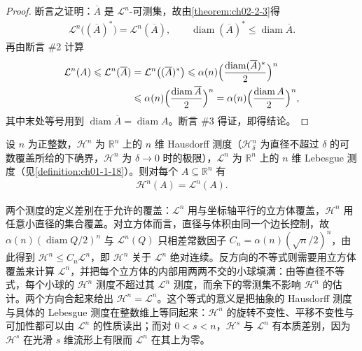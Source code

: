 \documentclass[../../main.tex]{subfiles}%
\begin{document}
\begin{proof}
断言之证明：$\overline A$ 是 $\mathcal{L}^n$-可测集，故由\cref{theorem:ch02-2-3}得%
\begin{align*}
\mathcal{L}^n\bigl((\overline A)^{*}\bigr)=\mathcal{L}^n(\overline A),\qquad
\operatorname{diam}(\overline A)^{*}\leqslant\operatorname{diam}\overline A .
\end{align*}
再由断言 \#2 计算
\begin{align*}
\mathcal{L}^n(A)\leqslant\mathcal{L}^n(\overline A)
&=\mathcal{L}^n\bigl((\overline A)^{*}\bigr)
\leqslant\alpha(n)\Bigl(\frac{\operatorname{diam}(\overline A)^{*}}{2}\Bigr)^n\\
&\leqslant\alpha(n)\Bigl(\frac{\operatorname{diam}\overline A}{2}\Bigr)^n
=\alpha(n)\Bigl(\frac{\operatorname{diam}A}{2}\Bigr)^n ,
\end{align*}
其中末处等号用到 $\operatorname{diam}\overline A=\operatorname{diam}A$。断言 \#3 得证，即得结论。
\end{proof}

\begin{theorem}\label{theorem:ch02-2-5}
设 $n$ 为正整数，$\mathcal{H}^n$ 为 $\mathbb{R}^n$ 上的 $n$ 维 Hausdorff 测度（$\mathcal{H}^n_\delta$ 为直径不超过 $\delta$ 的可数覆盖所给的下确界，$\mathcal{H}^n$ 为 $\delta\to0$ 时的极限），$\mathcal{L}^n$ 为 $\mathbb{R}^n$ 上的 $n$ 维 Lebesgue 测度（见\cref{definition:ch01-1-18}）。则对每个 $A\subseteq\mathbb{R}^n$ 有 %
\begin{align*}
\mathcal{H}^n(A)=\mathcal{L}^n(A).
\end{align*}
\end{theorem}

\begin{remark}\label{remark:ch02-thm-2-5-动机}
两个测度的定义差别在于允许的覆盖：$\mathcal{L}^n$ 用与坐标轴平行的立方体覆盖，$\mathcal{H}^n$ 用任意小直径的集合覆盖。对立方体而言，直径与体积由同一个边长控制，故 $\alpha(n)(\operatorname{diam}Q/2)^n$ 与 $\mathcal{L}^n(Q)$ 只相差常数因子 $C_n=\alpha(n)(\sqrt n/2)^n$，由此得到 $\mathcal{H}^n\leqslant C_n\mathcal{L}^n$，即 $\mathcal{H}^n$ 关于 $\mathcal{L}^n$ 绝对连续。反方向的不等式则需要用立方体覆盖来计算 $\mathcal{L}^n$，并把每个立方体的内部用两两不交的小球填满：由等直径不等式，每个小球的 $\mathcal{H}^n$ 测度不超过其 $\mathcal{L}^n$ 测度，而余下的零测集不影响 $\mathcal{H}^n$ 的估计。两个方向合起来给出 $\mathcal{H}^n=\mathcal{L}^n$。这个等式的意义是把抽象的 Hausdorff 测度与具体的 Lebesgue 测度在整数维上等同起来：$\mathcal{H}^n$ 的旋转不变性、平移不变性与可加性都可以由 $\mathcal{L}^n$ 的性质读出；而对 $0<s<n$，$\mathcal{H}^s$ 与 $\mathcal{L}^n$ 有本质差别，因为 $\mathcal{H}^s$ 在光滑 $s$ 维流形上有限而 $\mathcal{L}^n$ 在其上为零。
\end{remark}
\end{document}
